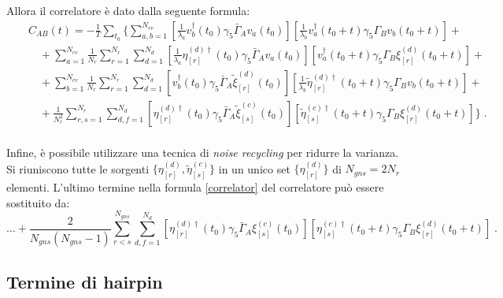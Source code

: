 \documentclass[a4paper]{article}
\newcommand{\point}{\; .}
\begin{document}
Allora il correlatore \`{e} dato dalla seguente formula:
\begin{eqnarray}
&& C_{AB}(t) = - \frac{1}{T} \sum_{t_0} \Big\{
\sum_{a,b=1}^{N_{ev}}
\left[ \frac{1}{\lambda_a} v_b^\dagger(t_0) \gamma_5 \bar{\Gamma}_A v_a(t_0) \right]
\left[ \frac{1}{\lambda_b} v_a^\dagger(t_0+t) \gamma_5 \Gamma_B v_b(t_0+t) \right]
+ \nonumber \\
&& \quad + 
\sum_{a=1}^{N_{ev}} \frac{1}{N_r} \sum_{r=1}^{N_{r}} \sum_{d=1}^{N_{d}} 
\left[ \frac{1}{\lambda_a} \eta_{[r]}^{(d)\dagger}(t_0) \gamma_5 \bar{\Gamma}_A v_a(t_0) \right]
\left[ v_a^\dagger(t_0+t) \gamma_5 \Gamma_B \xi_{[r]}^{(d)}(t_0+t) \right]
+ \nonumber \\
&& \quad + 
\sum_{b=1}^{N_{ev}} \frac{1}{N_r} \sum_{r=1}^{N_{r}} \sum_{d=1}^{N_{d}}
\left[ v_b^\dagger(t_0) \gamma_5 \bar{\Gamma}_A \tilde{\xi}_{[r]}^{(d)}(t_0) \right]
\left[ \frac{1}{\lambda_b} \tilde{\eta}_{[r]}^{(d)\dagger}(t_0+t) \gamma_5 \Gamma_B v_b(t_0+t) \right]
+ \nonumber \\
&& \quad + 
\frac{1}{N_r^2} \sum_{r,s=1}^{N_{r}} \sum_{d,f=1}^{N_{d}}
\left[ \eta_{[r]}^{(d)\dagger}(t_0) \gamma_5 \bar{\Gamma}_A \tilde{\xi}_{[s]}^{(c)}(t_0) \right]
\left[ \tilde{\eta}_{[s]}^{(c)\dagger}(t_0+t) \gamma_5 \Gamma_B \xi_{[r]}^{(d)}(t_0+t) \right]
\Big\} \point \nonumber \\
&& \label{correlator}
\end{eqnarray}

Infine, \`{e} possibile utilizzare una tecnica di \textit{noise recycling} per ridurre la varianza. Si riuniscono tutte le sorgenti $\{ \eta_{[r]}^{(d)}, \tilde{\eta}_{[s]}^{(c)} \}$ in un unico set $\{ \eta_{[r]}^{(d)} \}$ di $N_{gns} = 2N_r$ elementi. L'ultimo termine nella formula \ref{correlator} del correlatore pu\`{o} essere sostituito da:
\begin{equation} \label{correlator_with_nr}
\dots + \frac{2}{N_{gns} (N_{gns}-1)} \sum_{r<s}^{N_{gns}} \sum_{d,f=1}^{N_{d}}
\left[ \eta_{[r]}^{(d)\dagger}(t_0) \gamma_5 \bar{\Gamma}_A \xi_{[s]}^{(c)}(t_0) \right]
\left[ \eta_{[s]}^{(c)\dagger}(t_0+t) \gamma_5 \Gamma_B \xi_{[r]}^{(d)}(t_0+t) \right] \point
\end{equation}



\subsection{Termine di hairpin}
\end{document}
